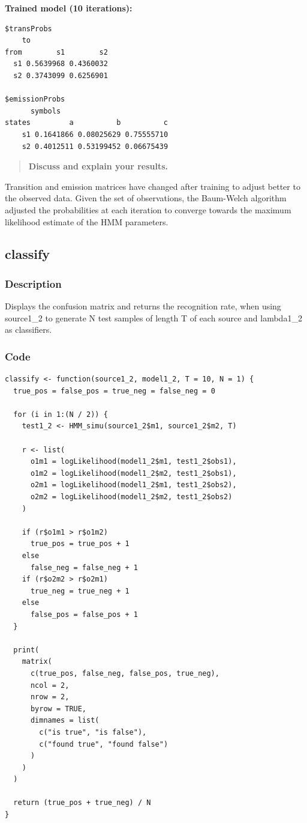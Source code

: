 \documentclass[a4paper]{article}
\begin{document}
\textbf{Trained model (10 iterations):}

\begin{lstlisting}
$transProbs
    to
from        s1        s2
  s1 0.5639968 0.4360032
  s2 0.3743099 0.6256901

$emissionProbs
      symbols
states         a          b          c
    s1 0.1641866 0.08025629 0.75555710
    s2 0.4012511 0.53199452 0.06675439
\end{lstlisting}

\begin{quotation}
\textbf{Discuss and explain your results.}
\end{quotation}

Transition and emission matrices have changed after training to adjust better to the observed data. Given the set of observations, the Baum-Welch algorithm adjusted the probabilities at each iteration to converge towards the maximum likelihood estimate of the HMM parameters.

\subsection{classify}

\subsubsection{Description}
Displays the confusion matrix and returns the recognition rate, when using source1\_2 to generate N test samples of length T of each source and lambda1\_2 as classifiers.

\subsubsection{Code}

\begin{lstlisting}
classify <- function(source1_2, model1_2, T = 10, N = 1) {
  true_pos = false_pos = true_neg = false_neg = 0
  
  for (i in 1:(N / 2)) {
    test1_2 <- HMM_simu(source1_2$m1, source1_2$m2, T)
    
    r <- list(
      o1m1 = logLikelihood(model1_2$m1, test1_2$obs1),
      o1m2 = logLikelihood(model1_2$m2, test1_2$obs1),
      o2m1 = logLikelihood(model1_2$m1, test1_2$obs2),
      o2m2 = logLikelihood(model1_2$m2, test1_2$obs2)
    )
    
    if (r$o1m1 > r$o1m2)
      true_pos = true_pos + 1
    else
      false_neg = false_neg + 1
    if (r$o2m2 > r$o2m1)
      true_neg = true_neg + 1
    else
      false_pos = false_pos + 1
  }
  
  print(
    matrix(
      c(true_pos, false_neg, false_pos, true_neg),
      ncol = 2,
      nrow = 2,
      byrow = TRUE,
      dimnames = list(
        c("is true", "is false"), 
        c("found true", "found false")
      )
    )
  )
  
  return (true_pos + true_neg) / N
}
\end{lstlisting}
\end{document}
